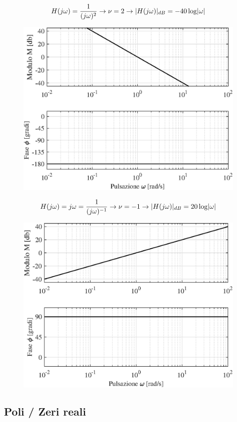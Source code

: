 \begin{nexample}
	\[ H(j\omega) = \frac{1}{(j\omega)^2} \rightarrow \nu = 2 \rightarrow \lvert H(j\omega)\rvert_{dB} = -40 \log \lvert\omega\rvert\]
\begin{figure}[H]
	\centering
	\includegraphics[width=0.7\linewidth]{immagini/cap6_Bode/es1.eps}
	\label{fig:Bode_es1}
\end{figure}
\end{nexample}

\begin{nexample}
	\[ H(j\omega) =j\omega = \frac{1}{(j\omega)^{-1}} \rightarrow \nu = -1 \rightarrow \lvert H(j\omega)\rvert_{dB} = 20 \log \lvert\omega\rvert\]
\begin{figure}[H]
	\centering
	\includegraphics[width=0.7\linewidth]{immagini/cap6_Bode/es2.eps}
	\label{fig:Bode_es2}
\end{figure}
\end{nexample}

\subsection{Poli / Zeri reali}

